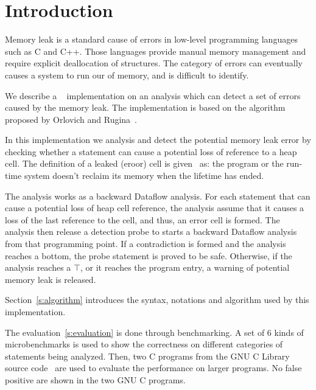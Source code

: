 \section{Introduction}
Memory leak is a standard cause of errors in low-level programming languages
such as C and C++. Those languages provide manual memory management and require
explicit deallocation of structures. The category of errors can eventually
causes a system to run our of memory, and is difficult to identify.

We describe a \llvm~\cite{llvm} implementation on an analysis which
can detect a set of errors caused by the memory leak. The implementation is
based on the algorithm proposed by Orlovich and Rugina~\cite{rugina}.

In this implementation we analysis and detect the potential memory leak error
by checking whether a statement can cause a potential loss of reference to a 
heap cell. The definition of a leaked (eroor) cell is given~\cite{rugina} as: the 
program or the run-time system doesn't reclaim its memory when the lifetime 
has ended.

The analysis works as a backward Dataflow analysis. For each statement that 
can cause a potential loss of heap cell reference, the analysis assume that 
it causes a loss of the last reference to the cell, and thus, an error cell
is formed. The analysis then release a detection probe to starts a backward 
Dataflow analysis from that programming point. If a contradiction is formed 
and the analysis reaches a bottom, the probe statement is proved to be safe. 
Otherwise, if the analysis reaches a $\top$, or it reaches the program entry, 
a warning of potential memory leak is released.

Section~\ref{s:algorithm} introduces the syntax, notations and algorithm
used by this implementation.

The evaluation~\ref{s:evaluation} is done through benchmarking. A set of 6 kinds
of microbenchmarks is used to show the correctness on different categories of
statements being analyzed. Then, two C programs from the GNU C Library source
code~\cite{glibc} are used to evaluate the performance on larger programs. No 
false positive are shown in the two GNU C programs.
